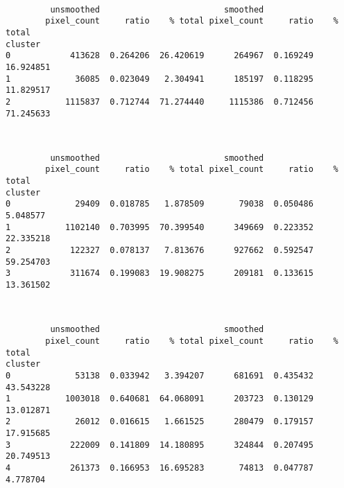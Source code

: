 \documentclass[11pt]{article}
\begin{document}
    \begin{center}
    \end{center}
    { \hspace*{\fill} \\}
    
    
    \begin{verbatim}
         unsmoothed                         smoothed                     
        pixel_count     ratio    % total pixel_count     ratio    % total
cluster                                                                  
0            413628  0.264206  26.420619      264967  0.169249  16.924851
1             36085  0.023049   2.304941      185197  0.118295  11.829517
2           1115837  0.712744  71.274440     1115386  0.712456  71.245633
    \end{verbatim}

    
    \begin{center}
    \end{center}
    { \hspace*{\fill} \\}
    
    
    \begin{verbatim}
         unsmoothed                         smoothed                     
        pixel_count     ratio    % total pixel_count     ratio    % total
cluster                                                                  
0             29409  0.018785   1.878509       79038  0.050486   5.048577
1           1102140  0.703995  70.399540      349669  0.223352  22.335218
2            122327  0.078137   7.813676      927662  0.592547  59.254703
3            311674  0.199083  19.908275      209181  0.133615  13.361502
    \end{verbatim}

    
    \begin{center}
    \end{center}
    { \hspace*{\fill} \\}
    
    
    \begin{verbatim}
         unsmoothed                         smoothed                     
        pixel_count     ratio    % total pixel_count     ratio    % total
cluster                                                                  
0             53138  0.033942   3.394207      681691  0.435432  43.543228
1           1003018  0.640681  64.068091      203723  0.130129  13.012871
2             26012  0.016615   1.661525      280479  0.179157  17.915685
3            222009  0.141809  14.180895      324844  0.207495  20.749513
4            261373  0.166953  16.695283       74813  0.047787   4.778704
    \end{verbatim}
\end{document}
